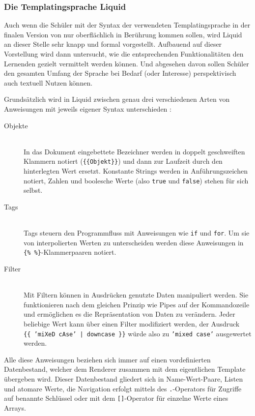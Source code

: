 \subsubsection{Die Templatingsprache Liquid}
\label{sec:liquid-language}

Auch wenn die Schüler mit der Syntax der verwendeten Templatingsprache in der finalen Version von \idename{} nur oberflächlich in Berührung kommen sollen, wird Liquid an dieser Stelle sehr knapp und formal vorgestellt. Aufbauend auf dieser Vorstellung wird dann untersucht, wie die entsprechenden Funktionalitäten den Lernenden gezielt vermittelt werden können. Und abgesehen davon sollen Schüler den gesamten Umfang der Sprache bei Bedarf (oder Interesse) perspektivisch auch textuell Nutzen können.

Grundsätzlich wird in Liquid zwischen genau drei verschiedenen Arten von Anweisungen mit jeweils eigener Syntax unterschieden \cite{liquid-introduction}:

\begin{description}
\item[Objekte] \hfill \\
  In das Dokument eingebettete Bezeichner werden in doppelt geschweiften Klammern notiert (\texttt{\{\{Objekt\}\}}) und dann zur Laufzeit durch den hinterlegten Wert ersetzt. Konstante Strings werden in Anführungszeichen notiert, Zahlen und boolesche Werte (also \texttt{true} und \texttt{false}) stehen für sich selbst.
\item[Tags] \hfill \\
  Tags steuern den Programmfluss mit Anweisungen wie \texttt{if} und \texttt{for}. Um sie von interpolierten Werten zu unterscheiden werden diese Anweisungen in \texttt{\{\% \%\}}-Klam\-mer\-paaren notiert.
\item[Filter] \hfill \\
  Mit Filtern können in Ausdrücken genutzte Daten manipuliert werden. Sie funktionieren nach dem gleichen Prinzip wie Pipes auf der Kommandozeile und ermöglichen es die Repräsentation von Daten zu verändern. Jeder beliebige Wert kann über einen Filter modifiziert werden, der Ausdruck \texttt{\{\{~'miXeD cAse'~|~downcase~\}\}} würde also zu \texttt{'mixed case'} ausgewertet werden.
\end{description}

Alle diese Anweisungen beziehen sich immer auf einen vordefinierten Datenbestand, welcher dem Renderer zusammen mit dem eigentlichen Template übergeben wird. Dieser Datenbestand gliedert sich in Name-Wert-Paare, Listen und atomare Werte, die Navigation erfolgt mittels des \texttt{.}-Operators für Zugriffe auf benannte Schlüssel oder mit dem \texttt{[]}-Operator für einzelne Werte eines Arrays.

